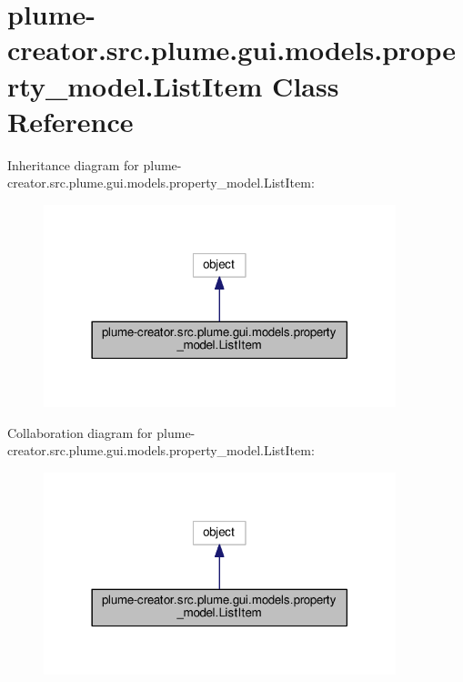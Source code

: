 \hypertarget{classplume-creator_1_1src_1_1plume_1_1gui_1_1models_1_1property__model_1_1_list_item}{}\section{plume-\/creator.src.\+plume.\+gui.\+models.\+property\+\_\+model.\+List\+Item Class Reference}
\label{classplume-creator_1_1src_1_1plume_1_1gui_1_1models_1_1property__model_1_1_list_item}


Inheritance diagram for plume-\/creator.src.\+plume.\+gui.\+models.\+property\+\_\+model.\+List\+Item\+:\nopagebreak
\begin{figure}[H]
\begin{center}
\leavevmode
\includegraphics[width=290pt]{classplume-creator_1_1src_1_1plume_1_1gui_1_1models_1_1property__model_1_1_list_item__inherit__graph}
\end{center}
\end{figure}


Collaboration diagram for plume-\/creator.src.\+plume.\+gui.\+models.\+property\+\_\+model.\+List\+Item\+:\nopagebreak
\begin{figure}[H]
\begin{center}
\leavevmode
\includegraphics[width=290pt]{classplume-creator_1_1src_1_1plume_1_1gui_1_1models_1_1property__model_1_1_list_item__coll__graph}
\end{center}
\end{figure}
